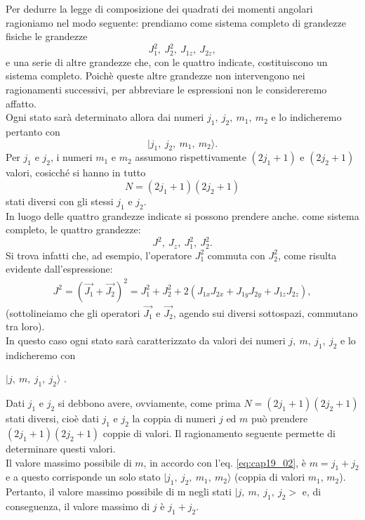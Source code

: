 \documentclass[a4paper,12pt,oneside]{book}
\begin{document}
Per dedurre la legge di composizione dei quadrati dei momenti angolari ragioniamo nel modo seguente: prendiamo come sistema completo di grandezze fisiche le grandezze
\begin{equation}
J_1^2 ,~ J_2^2 ,~ J_{1z} ,~ J_{2z} ,
\end{equation}
e una serie di altre grandezze che, con le quattro indicate, costituiscono un sistema completo. Poichè queste altre grandezze non intervengono nei ragionamenti successivi, per abbreviare le espressioni non le considereremo affatto.\\
Ogni stato sarà determinato allora dai numeri $j_1 , ~ j_2 ,~ m_1 , ~ m_2$ e lo indicheremo pertanto con
\begin{equation}
| j_1 , ~ j_2 ,~ m_1 ,~ m_2 \rangle .
\end{equation}
Per $j_1$ e $j_2$, i numeri $m_1$ e $m_2$ assumono rispettivamente $(2 j_1 + 1)$ e $(2 j_2 + 1)$ 
valori, cosicché si hanno in tutto
\begin{equation} \label{eq:cap19_03}
N= (2j_1 + 1) (2j_2 + 1) 
\end{equation}
stati diversi con gli stessi $j_1$ e $j_2$. \\
In luogo delle quattro grandezze indicate si possono prendere anche. come sistema completo, le quattro grandezze:
\begin{equation}
J^2 ,~ J_z ,~ J_1^2 ,~ J_2^2 . 
\end{equation}
Si trova infatti che, ad esempio, l'operatore $J_1^2$  commuta con $J_2^2$, come risulta evidente dall'espressione:
\begin{align}
J^2 = (\vec{J_1} + \vec{J_2})^2 = J_1^2 + J_2^2 + 2 (J_{1x} J_{2x} + J_{1y} J_{2y} + J_{1z} J_{2z}),
\end{align}
(sottolineiamo che gli operatori $\vec{J_1}$ e $\vec{J_2}$, agendo sui diversi sottospazi, commutano tra loro).\\
 In questo caso ogni stato sarà caratterizzato da valori dei numeri $j, ~  m, ~ j_1,~  j_2$ e lo indicheremo con
\begin{center}
$| j ,~ m,~j_1, ~ j_2 \rangle $ .
\end{center}
Dati $j_1$ e $j_2$ si debbono avere, ovviamente, come prima $N = (2j_1+1)(2j_2+1)$ stati diversi, cioè dati $j_1$ e $j_2$ la coppia di numeri $j$ ed $m$ può prendere $(2j_1+1)(2j_2+1)$ coppie di valori. Il ragionamento seguente permette di determinare questi valori.\\
Il valore massimo possibile di $m$, in accordo con l'eq. \eqref{eq:cap19_02}, è $m = j_1 + j_2$ e a questo corrisponde un solo stato $| j_1 ,~ j_2,~m_1, ~ m_2 \rangle $ (coppia di valori $m_1$, $m_2$). Pertanto, il valore massimo possibile di m negli stati $\mid j ,~ m,~j_1, ~ j_2 > $  e, di conseguenza, il valore massimo di $j$ è $j_1 + j_2$. 
\end{document}
